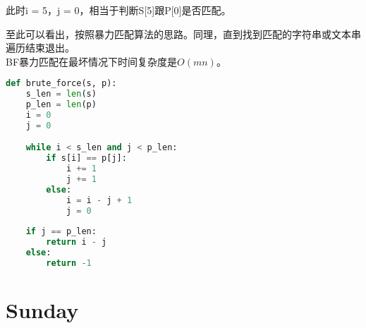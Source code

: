 此时i = 5，j = 0，相当于判断S[5]跟P[0]是否匹配。

\begin{table}[H]
	\centering
\end{table}

至此可以看出，按照暴力匹配算法的思路。同理，直到找到匹配的字符串或文本串遍历结束退出。 \\

BF暴力匹配在最坏情况下时间复杂度是$ O(mn) $。 \\


\begin{lstlisting}[language=Python]
def brute_force(s, p):
    s_len = len(s)
    p_len = len(p)
    i = 0
    j = 0

    while i < s_len and j < p_len:
        if s[i] == p[j]:
            i += 1
            j += 1
        else:
            i = i - j + 1
            j = 0
    
    if j == p_len:
        return i - j
    else:
        return -1
\end{lstlisting}

\newpage

\section{Sunday}

